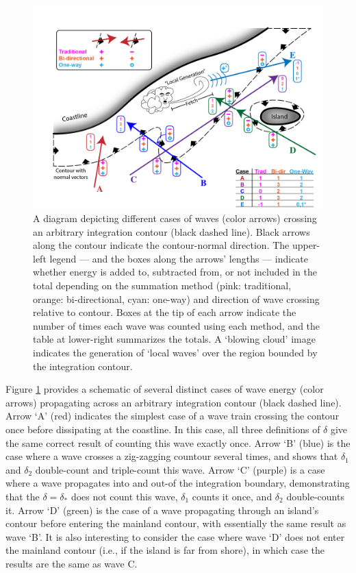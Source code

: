 \begin{figure}[ht]
    \centering
    \includegraphics[width=\linewidth]{../diagram/Schematic-Seq01FINAL.png}
    \caption{A diagram depicting different cases of waves (color arrows) crossing an arbitrary integration contour (black dashed line). Black arrows along the contour indicate the contour-normal direction. The upper-left legend — and the boxes along the arrows' lengths — indicate whether energy is added to, subtracted from, or not included in the total depending on the summation method (pink: traditional, orange: bi-directional, cyan: one-way) and direction of wave crossing relative to contour. Boxes at the tip of each arrow indicate the number of times each wave was counted using each method, and the table at lower-right summarizes the totals. A `blowing cloud' image indicates the generation of `local waves' over the region bounded by the integration contour. }
    \label{fig:one-way-diagram}
\end{figure}

Figure \ref{fig:one-way-diagram} provides a schematic of several distinct cases of wave energy (color arrows) propagating across an arbitrary integration contour (black dashed line). Arrow `A' (red) indicates the simplest case of a wave train crossing the contour once before dissipating at the coastline. In this case, all three definitions of $\delta$ give the same correct result of counting this wave exactly once. Arrow `B' (blue) is the case where a wave crosses a zig-zagging countour several times, and shows that $\delta_1$ and $\delta_2$ double-count and triple-count this wave. Arrow `C' (purple) is a case where a wave propagates into and out-of the integration boundary, demonstrating that the $\delta = \delta_*$ does not count this wave, $\delta_1$ counts it once, and $\delta_2$ double-counts it. Arrow `D' (green) is the case of a wave propagating through an island's contour before entering the mainland contour, with essentially the same result as wave `B'. It is also interesting to consider the case where wave `D' does not enter the mainland contour (i.e., if the island is far from shore), in which case the results are the same as wave C.


